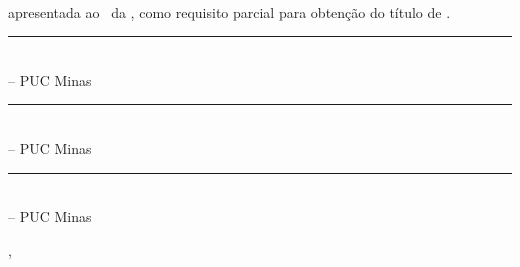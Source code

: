 
\makeatletter	%

	\thispagestyle{empty}
	
	\begin{center}
		\por %
	\end{center}
	
	\vfill %
	
	\begin{center}
		\textbf{\monog}\\ %
	\end{center}
	
	\vfill %
	
	\begin{flushright}
		\begin{minipage}{9cm}
			{\tipo apresentada ao \curso~da \univ, 
			como requisito parcial para obtenção do 
			título  de \grau.} %
			
			\bigskip
			
			
		\end{minipage}
	\end{flushright}
	
	\vfill %
	
	\begin{center}
		\rule{8cm}{0.01cm}\\ %
		\profOrientador -- PUC Minas %
	\end{center}
	
	\vfill %
	
	\begin{center}
		\rule{8cm}{0.01cm}\\  %
		\profA -- PUC Minas  %
	\end{center}
	
	\vfill %
	
	\begin{center}
		\rule{8cm}{0.01cm}\\  %
		\profA -- PUC Minas  %
	\end{center}
	
	\vfill %
	
	\begin{center}
		\cidade, \dataCompleta %
	\end{center}
\makeatletter	%
	\newpage %
